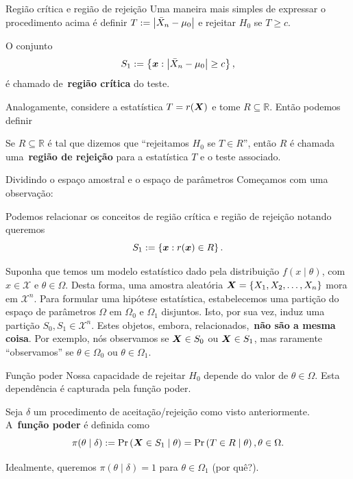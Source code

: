 \begin{frame}{Região crítica e região de rejeição}
 Uma maneira mais simples de expressar o procedimento acima é definir $T := \left|\bar{X}_n - \mu_0\right|$ e rejeitar $H_0$ se $T \geq c$.
 \begin{defn}
  O conjunto 
   \[ S_1 := \left\{ \boldsymbol{x}:  \left|\bar{X}_n - \mu_0\right| \geq c \right\}, \]
   é chamado de~\textbf{região crítica} do teste.
 \end{defn}
 
Analogamente, considere a estatística $T = r(\boldsymbol{X})$ e tome $R \subseteq \mathbb{R}$. 
Então podemos definir
\begin{defn}
Se $R \subseteq \mathbb{R}$ é tal que dizemos que ``rejeitamos $H_0$ se $T \in R$'', então $R$ é chamada uma~\textbf{região de rejeição} para a estatística $T$ e o teste associado.
\end{defn}
\end{frame}

\begin{frame}{Dividindo o espaço amostral e o espaço de parâmetros}
 Começamos com uma observação:
 \begin{obs}
 Podemos relacionar os conceitos de região crítica e região de rejeição notando queremos
   \[ S_1 := \left\{ \boldsymbol{x}:  r(\boldsymbol{x}) \in R \right\}. \]
\end{obs}

\begin{ideia}
 Suponha que temos um modelo estatístico dado pela distribuição $f(x\mid\theta)$, com $x \in \mathcal{X}$ e $\theta \in \Omega$.
 Desta forma, uma amostra aleatória $\boldsymbol{X} = \{ X_1, X_2, \ldots, X_n\}$ mora em $\mathcal{X}^n$.
 Para formular uma hipótese estatística, estabelecemos uma partição do espaço de parâmetros $\Omega$ em $\Omega_0$ e $\Omega_1$ disjuntos.
 Isto, por sua vez, induz uma partição $S_0, S_1 \in \mathcal{X}^n$.
 Estes objetos, embora, relacionados,~\textbf{não são a mesma coisa}.
 Por exemplo, nós observamos se $\boldsymbol{X} \in S_0$ ou $\boldsymbol{X} \in S_1$, mas raramente ``observamos'' se $\theta \in \Omega_0$ ou $\theta \in \Omega_1$.
\end{ideia}
\end{frame}

\begin{frame}{Função poder}
 Nossa capacidade de rejeitar $H_0$ depende do valor de $\theta \in \Omega$.
 Esta dependência é capturada pela função poder.
 \begin{defn}
  Seja $\delta$ um procedimento de aceitação/rejeição como visto anteriormente.
  A~\textbf{função poder} é definida como 
  \begin{equation}
   \label{eq:power_function}
   \pi(\theta\mid \delta) := \operatorname{Pr}\left(\boldsymbol{X} \in S_1 \mid \theta\right) = \operatorname{Pr}\left(T \in R \mid \theta\right), \theta \in \Omega.
  \end{equation}
 \end{defn}
Idealmente, queremos $\pi(\theta \mid \delta) = 1$ para $\theta \in \Omega_1$ (por quê?).
\end{frame}

